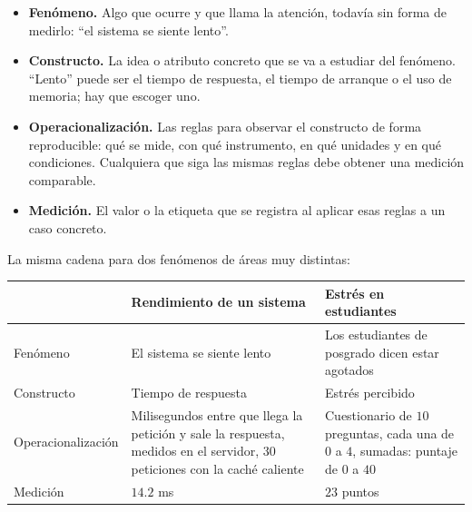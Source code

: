 \documentclass[11pt,letterpaper]{article}
\begin{document}
\begin{itemize}[itemsep=0.3em]
    \item \textbf{Fenómeno.} Algo que ocurre y que llama la atención,
          todavía sin forma de medirlo: ``el sistema se siente lento''.
    \item \textbf{Constructo.} La idea o atributo concreto que se va a
          estudiar del fenómeno. ``Lento'' puede ser el tiempo de
          respuesta, el tiempo de arranque o el uso de memoria; hay que
          escoger uno.
    \item \textbf{Operacionalización.} Las reglas para observar el
          constructo de forma reproducible: qué se mide, con qué
          instrumento, en qué unidades y en qué condiciones. Cualquiera
          que siga las mismas reglas debe obtener una medición
          comparable.
    \item \textbf{Medición.} El valor o la etiqueta que se registra al
          aplicar esas reglas a un caso concreto.
\end{itemize}

\begin{ejemplo}
    La misma cadena para dos fenómenos de áreas muy distintas:
    \begin{center}
    \small
    \begin{tabular}{l>{\raggedright\arraybackslash}p{5.2cm}%
                     >{\raggedright\arraybackslash}p{5.2cm}}
        \toprule
        & \textbf{Rendimiento de un sistema}
        & \textbf{Estrés en estudiantes} \\
        \midrule
        Fenómeno & El sistema se siente lento
                 & Los estudiantes de posgrado dicen estar
                   agotados \\
        \addlinespace
        Constructo & Tiempo de respuesta & Estrés percibido \\
        \addlinespace
        Operacionalización & Milisegundos entre que llega la petición
                             y sale la respuesta, medidos en el
                             servidor, $30$ peticiones con la caché
                             caliente
                           & Cuestionario de $10$ preguntas, cada una
                             de $0$ a $4$, sumadas: puntaje de $0$ a
                             $40$ \\
        \addlinespace
        Medición & $14.2$ ms & $23$ puntos \\
        \bottomrule
    \end{tabular}
    \end{center}
\end{ejemplo}
\end{document}
